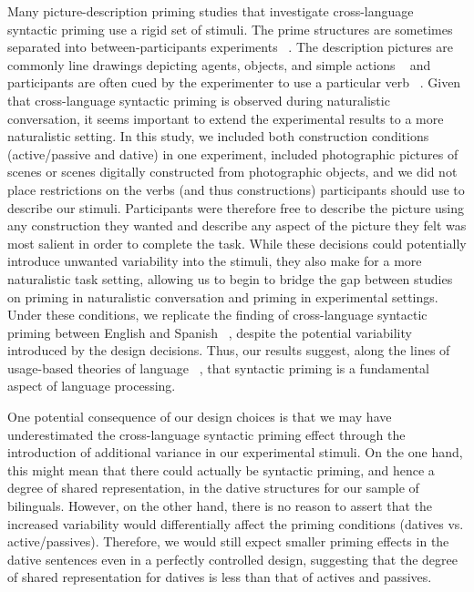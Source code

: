 Many picture-description priming studies that investigate cross-language syntactic priming use a rigid set of stimuli. The prime structures are sometimes separated into between-participants experiments ~\citep[e.g.,][]{Bernolet2009}. The description pictures are commonly line drawings depicting agents, objects, and simple actions ~\citep[e.g.,][]{Bernolet2010,Flett2012,Hartsuiker2004,Loebell2003} and participants are often cued by the experimenter to use a particular verb ~\citep[e.g.,][]{Bernolet2010,Flett2012,Hartsuiker2004}. Given that cross-language syntactic priming is observed during naturalistic conversation, it seems important to extend the experimental results to a more naturalistic setting. In this study, we included both construction conditions (active\slash passive and dative) in one experiment, included photographic pictures of scenes or scenes digitally constructed from photographic objects, and we did not place restrictions on the verbs (and thus constructions) participants should use to describe our stimuli. Participants were therefore free to describe the picture using any construction they wanted and describe any aspect of the picture they felt was most salient in order to complete the task. While these decisions could potentially introduce unwanted variability into the stimuli, they also make for a more naturalistic task setting, allowing us to begin to bridge the gap between studies on priming in naturalistic conversation and priming in experimental settings. Under these conditions, we replicate the finding of cross-language syntactic priming between English and Spanish ~\citep{Flett2003, Hartsuiker2004, Meijer2003}, despite the potential variability introduced by the design decisions. Thus, our results suggest, along the lines of usage-based theories of language ~\citep{Bybee2006,Bybee2010}, that syntactic priming is a fundamental aspect of language processing. 

One potential consequence of our design choices is that we may have underestimated the cross-language syntactic priming effect through the introduction of additional variance in our experimental stimuli. On the one hand, this might mean that there could actually be syntactic priming, and hence a degree of shared representation, in the dative structures for our sample of bilinguals. However, on the other hand, there is no reason to assert that the increased variability would differentially affect the priming conditions (datives vs. active\slash passives). Therefore, we would still expect smaller priming effects in the dative sentences even in a perfectly controlled design, suggesting that the degree of shared representation for datives is less than that of actives and passives. 

